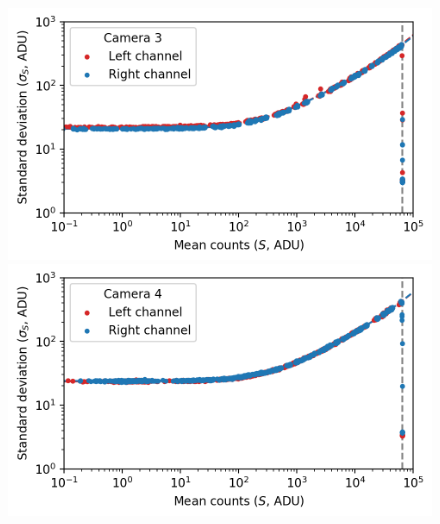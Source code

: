 \begin{colsection}
\begin{figure}[p]
\begin{center}
        \begin{minipage}[t]{0.49\linewidth}\vspace{10pt}
            \includegraphics[width=\linewidth]{images/detectors/ptc_3.png}
        \end{minipage}
        \begin{minipage}[t]{0.49\linewidth}\vspace{10pt}
            \includegraphics[width=\linewidth]{images/detectors/ptc_4.png}
        \end{minipage}


\end{center}
\end{figure}
\end{colsection}
